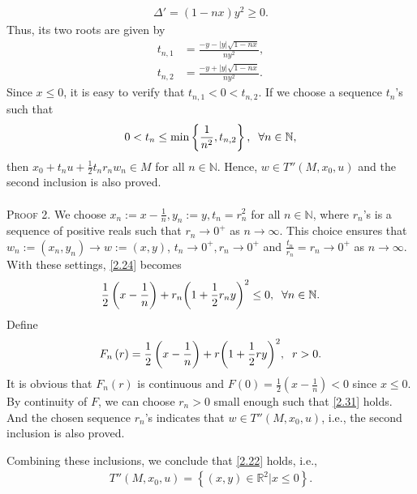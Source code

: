 \documentclass[a4paper]{article}
\numberwithin{equation}{section}
\begin{document}
\begin{enumerate}
\begin{enumerate}
\begin{align}
\Delta ' = \left( {1 - nx} \right){y^2} \ge 0.
\end{align}
Thus, its two roots are given by
\begin{align}
{t_{n,1}} &= \frac{{ - y - \left| y \right|\sqrt {1 - nx} }}{{n{y^2}}},\\
{t_{n,2}} &= \frac{{ - y + \left| y \right|\sqrt {1 - nx} }}{{n{y^2}}}.
\end{align}
Since $x\le 0$, it is easy to verify that $t_{n,1}<0<t_{n,2}$. If we choose a sequence $t_n$'s such that 
\begin{align}
0 < {t_n} \le \min \left\{ {\frac{1}{{{n^2}}},{t_{n,2}}} \right\},\hspace{0.2cm}\forall n \in \mathbb{N},
\end{align}
then ${x_0} + {t_n}u + \frac{1}{2}{t_n}{r_n}{w_n} \in M$ for all $n\in \mathbb{N}$. Hence, $w\in T''\left(M,x_0,u\right)$ and the second inclusion is also proved.\\
\\
\textsc{Proof 2.} We choose $x_n:=x-\frac{1}{n},y_n:=y,t_n=r_n^2$ for all $n\in \mathbb{N}$, where $r_n$'s is a sequence of positive reals such that $r_n\to 0^+$ as $n\to \infty$. This choice ensures that $w_n:=\left(x_n,y_n\right)\to w:=\left(x,y\right)$, $t_n\to 0^+,r_n\to 0^+$ and $\frac{t_n}{r_n}=r_n\to 0^+$ as $n\to \infty$. With these settings, \eqref{2.24} becomes
\begin{align}
\label{2.31}
\frac{1}{2}\left( {x - \frac{1}{n}} \right) + {r_n}{\left( {1 + \frac{1}{2}{r_n}y} \right)^2} \le 0,\hspace{0.2cm}\forall n \in \mathbb{N}.
\end{align}
Define 
\begin{align}
F_n\left( r \right) = \frac{1}{2}\left( {x - \frac{1}{n}} \right) + r{\left( {1 + \frac{1}{2}ry} \right)^2},\hspace{0.2cm} r > 0.
\end{align}
It is obvious that $F_n\left(r\right)$ is continuous and $F\left( 0 \right) = \frac{1}{2}\left( {x - \frac{1}{n}} \right) < 0$ since $x\le 0$. By continuity of $F$, we can choose $r_n>0$ small enough such that \eqref{2.31} holds. And the chosen sequence $r_n$'s indicates that $w\in T''\left(M,x_0,u\right)$, i.e., the second inclusion is also proved. 
\end{enumerate}
Combining these inclusions, we conclude that \eqref{2.22} holds, i.e.,
\begin{align}
T''\left( {M,{x_0},u} \right) = \left\{ {\left( {x,y} \right) \in {\mathbb{R}^2}|x \le 0} \right\}.
\end{align}
\end{enumerate}
\end{document}
